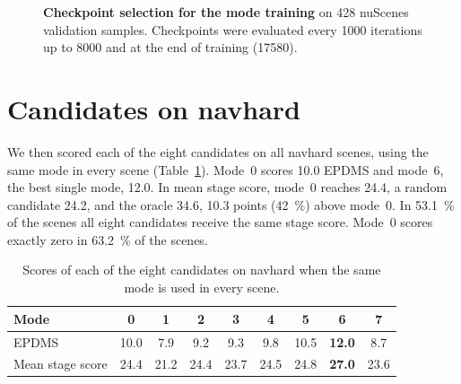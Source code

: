 \documentclass[11pt, a4paper, oneside]{book}
\begin{document}
\begin{figure}[ht]
\centering
{}
\caption[Checkpoint selection for the mode training]{\textbf{Checkpoint selection for the mode
training} on 428 nuScenes validation samples. Checkpoints were evaluated every \num{1000}
iterations up to \num{8000} and at the end of training (\num{17580}).}
\label{fig:convergence}
\end{figure}

\section{Candidates on navhard}
\label{sec:candresult}
We then scored each of the eight candidates on all navhard scenes, using the same mode in every
scene (Table~\ref{tab:permode}). Mode~0 scores \num{10.0} EPDMS and mode~6, the best single
mode, \num{12.0}. In mean stage score, mode~0 reaches \num{24.4}, a random candidate \num{24.2},
and the oracle \num{34.6}, \num{10.3} points (\SI{42}{\percent}) above mode~0. In
\SI{53.1}{\percent} of the scenes all eight candidates receive the same stage score. Mode~0
scores exactly zero in \SI{63.2}{\percent} of the scenes.

\begin{table}[ht]
\centering
\caption[Scores of the eight candidates on navhard]{Scores of each of the eight candidates on
navhard when the same mode is used in every scene.}
\label{tab:permode}
\small
\setlength{\tabcolsep}{5pt}
\begin{tabular}{@{}lcccccccc@{}}
\toprule
Mode & 0 & 1 & 2 & 3 & 4 & 5 & 6 & 7 \\
\midrule
EPDMS & 10.0 & 7.9 & 9.2 & 9.3 & 9.8 & 10.5 & \textbf{12.0} & 8.7 \\
Mean stage score & 24.4 & 21.2 & 24.4 & 23.7 & 24.5 & 24.8 & \textbf{27.0} & 23.6 \\
\bottomrule
\end{tabular}
\end{table}
\end{document}
